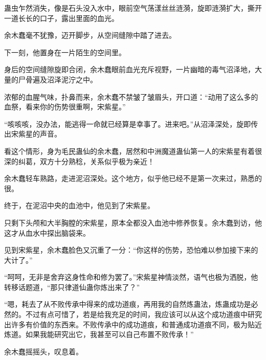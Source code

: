\begin{this_body}
蛊虫乍然消失，像是石头没入水中，眼前空气荡漾丝丝涟漪，旋即涟漪扩大，撕开一道长长的口子，露出里面的血光。

余木蠢毫不犹豫，迈开脚步，从空间缝隙中踏了进去。

下一刻，他置身在一片陌生的空间里。

身后的空间缝隙旋即合闭，余木蠢眼前血光充斥视野，一片幽暗的毒气沼泽地，大量的尸骨遍及沼泽泥泞之中。

浓郁的血腥气味，扑鼻而来，余木蠢不禁皱了皱眉头，开口道：“动用了这么多的血祭，看来你的伤势很重啊，宋紫星。”

“咳咳咳，没办法，能逃得一命就已经算是幸事了。进来吧。”从沼泽深处，旋即传出宋紫星的声音。

看这个情形，身为毛民蛊仙的余木蠢，居然和中洲魔道蛊仙第一人的宋紫星有着很深的纠葛，双方十分熟稔，关系似乎极为亲近！

余木蠢轻车熟路，走进泥沼深处。这个地方，似乎他已经不是第一次来过，熟悉的很。

终于，在泥沼中央的血池中，他见到了宋紫星。

只剩下头颅和大半胸膛的宋紫星，原本全都没入血池中修养恢复。余木蠢到访，他这才从血水中探出脑袋来。

见到宋紫星，余木蠢脸色又沉重了一分：“你这样的伤势，恐怕难以参加接下来的大计了。”

“呵呵，无非是舍弃这身性命和修为罢了。”宋紫星神情淡然，语气也极为洒脱，他转移话题道，“那只律道仙蛊你炼出来了？”

“嗯，耗去了从不败传承中得来的成功道痕，再用我的自然炼蛊法，炼蛊成功是必然的。不过有点可惜了，若是给我充足的时间，我应该可以从这个成功道痕中研究出许多有价值的东西来。不败传承中的成功道痕，和普通成功道痕不同，极为贴近炼道。如果我能研究出它，我甚至可以自己布置不败传承！”

余木蠢摇摇头，叹息着。

\end{this_body}

